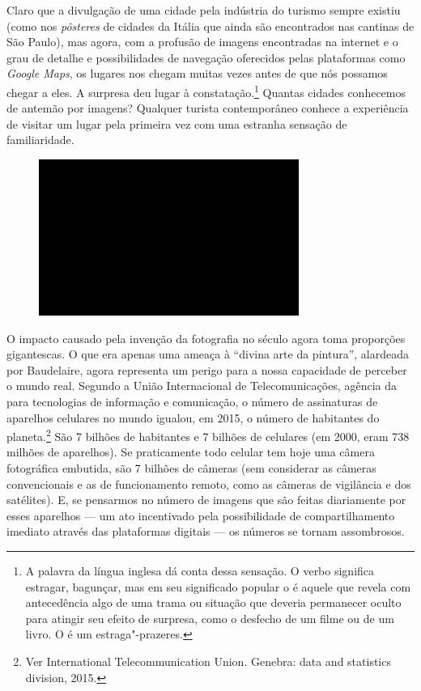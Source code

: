 Claro que a divulgação de uma cidade pela indústria do turismo sempre
existiu (como nos \emph{pôsteres} de cidades da Itália que ainda são
encontrados nas cantinas de São Paulo), mas agora, com a profusão de
imagens encontradas na internet e o grau de detalhe e possibilidades de
navegação oferecidos pelas plataformas como \emph{Google Maps}, os
lugares nos chegam muitas vezes antes de que nós possamos chegar a eles.
A surpresa deu lugar à constatação.\footnote{A palavra da língua inglesa
  {} dá conta dessa sensação. O verbo {}
  significa estragar, bagunçar, mas em seu significado popular o
  {} é aquele que revela com antecedência algo de uma trama
  ou situação que deveria permanecer oculto para atingir seu efeito de
  surpresa, como o desfecho de um filme ou de um livro. O {}
  é um estraga"-prazeres.} Quantas cidades conhecemos de antemão por
imagens? Qualquer turista contemporâneo conhece a experiência de visitar
um lugar pela primeira vez com uma estranha sensação de familiaridade.

\begin{figure}[!ht]
\centering
 \includegraphics[width=85mm]{./imgs/im1.jpg}
\caption{\tiny{}}
\end{figure}

O impacto causado pela invenção da fotografia no século  agora toma
proporções gigantescas. O que era apenas uma ameaça à ``divina arte da
pintura'', alardeada por Baudelaire, agora representa um perigo para a
nossa capacidade de perceber o mundo real. Segundo a União Internacional
de Telecomunicações, agência da  para tecnologias de informação e
comunicação, o número de assinaturas de aparelhos celulares no mundo
igualou, em 2015, o número de habitantes do planeta.\footnote{Ver
  International Telecommunication Union. {} Genebra:  data and statistics division, 2015.} São 7
bilhões de habitantes e 7 bilhões de celulares (em 2000, eram 738
milhões de aparelhos). Se praticamente todo celular tem hoje uma câmera
fotográfica embutida, são 7 bilhões de câmeras (sem considerar as
câmeras convencionais e as de funcionamento remoto, como as câmeras de
vigilância e dos satélites). E, se pensarmos no número de imagens que
são feitas diariamente por esses aparelhos --- um ato incentivado pela
possibilidade de compartilhamento imediato através das plataformas
digitais --- os números se tornam assombrosos.

